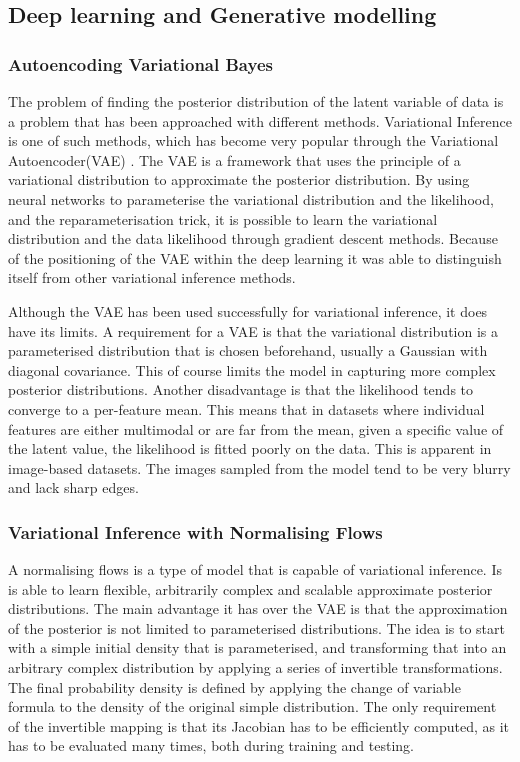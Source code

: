 \documentclass{article}
\begin{document}
\subsection{Deep learning and Generative modelling}

\subsubsection*{Autoencoding Variational Bayes}
The problem of finding the posterior distribution of the latent variable of data is a problem that has been approached with different methods. Variational Inference is one of such methods, which has become very popular through the Variational Autoencoder(VAE) \cite{kingma2013auto}. The VAE is a framework that uses the principle of a variational distribution to approximate the posterior distribution. By using neural networks to parameterise the variational distribution and the likelihood, and the reparameterisation trick, it is possible to learn the variational distribution and the data likelihood through gradient descent methods. Because of the positioning of the VAE within the deep learning it was able to distinguish itself from other variational inference methods. 

Although the VAE has been used successfully for variational inference, it does have its limits. A requirement for a VAE is that the variational distribution is a parameterised distribution that is chosen beforehand, usually a Gaussian with diagonal covariance. This of course limits the model in capturing more complex posterior distributions. Another disadvantage is that the likelihood tends to converge to a per-feature mean. This means that in datasets where individual features are either multimodal or are far from the mean, given a specific value of the latent value, the likelihood is fitted poorly on the data. This is apparent in image-based datasets. The images sampled from the model tend to be very blurry and lack sharp edges.

\subsubsection*{Variational Inference with Normalising Flows}
A normalising flows is a type of model that is capable of variational inference. Is is able to learn flexible, arbitrarily complex and scalable approximate posterior distributions. The main advantage it has over the VAE is that the approximation of the posterior is not limited to parameterised distributions. The idea is to start with a simple initial density that is parameterised, and transforming that into an arbitrary complex distribution by applying a series of invertible transformations. The final probability density is defined by applying the change of variable formula to the density of the original simple distribution. The only requirement of the invertible mapping is that its Jacobian has to be efficiently computed, as it has to be evaluated many times, both during training and testing.
\end{document}
